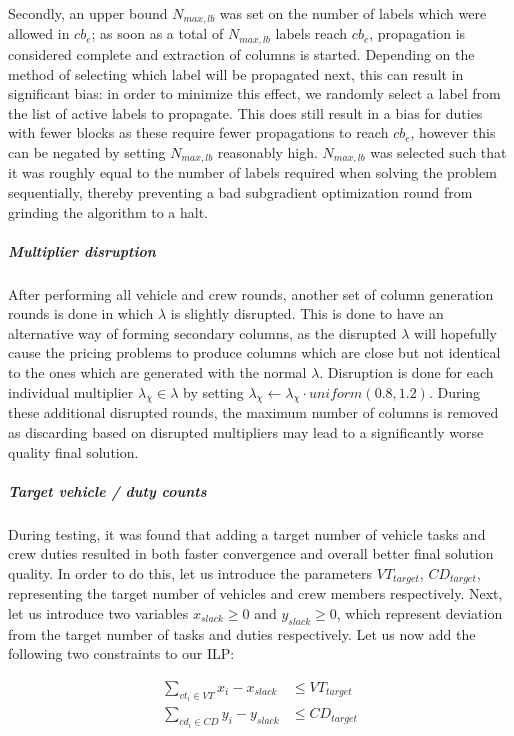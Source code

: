 \documentclass[]{article}
\begin{document}
Secondly, an upper bound $N_{max,lb}$ was set on the number of labels which were allowed in $cb_e$; as soon as a total of $N_{max,lb}$ labels reach $cb_e$, propagation is considered complete and extraction of columns is started. Depending on the method of selecting which label will be propagated next, this can result in significant bias: in order to minimize this effect, we randomly select a label from the list of active labels to propagate. This does still result in a bias for duties with fewer blocks as these  require fewer propagations to reach $cb_e$, however this can be negated by setting $N_{max,lb}$ reasonably high. $N_{max,lb}$ was selected such that it was roughly equal to the number of labels required when solving the problem sequentially, thereby preventing a bad subgradient optimization round from grinding the algorithm to a halt.

\subparagraph{Multiplier disruption} After performing all vehicle and crew rounds, another set of column generation rounds is done in which $\lambda$ is slightly disrupted. This is done to have an alternative way of forming secondary columns, as the disrupted $\lambda$ will hopefully cause the pricing problems to produce columns which are close but not identical to the ones which are generated with the normal $\lambda$. Disruption is done for each individual multiplier $\lambda_\chi \in \lambda$ by setting $\lambda_\chi \gets \lambda_\chi \cdot \textit{uniform}(0.8,1.2)$. During these additional disrupted rounds, the maximum number of columns is removed as discarding based on disrupted multipliers may lead to a significantly worse quality final solution. 

\subparagraph{Target vehicle / duty counts} During testing, it was found that adding a target number of vehicle tasks and crew duties resulted in both faster convergence and overall better final solution quality. In order to do this, let us introduce the parameters $VT_{target}$, $CD_{target}$, representing the target number of vehicles and crew members respectively. Next, let us introduce two variables $x_{slack} \geq 0$ and $y_{slack} \geq 0$, which represent deviation from the target number of tasks and duties respectively. Let us now add the following two constraints to our ILP:

\begin{align}
\sum_{vt_i \in VT} x_i - x_{slack} &\leq VT_{target} \\ 
\sum_{cd_i \in CD} y_i - y_{slack} &\leq CD_{target}
\end{align}
\end{document}

